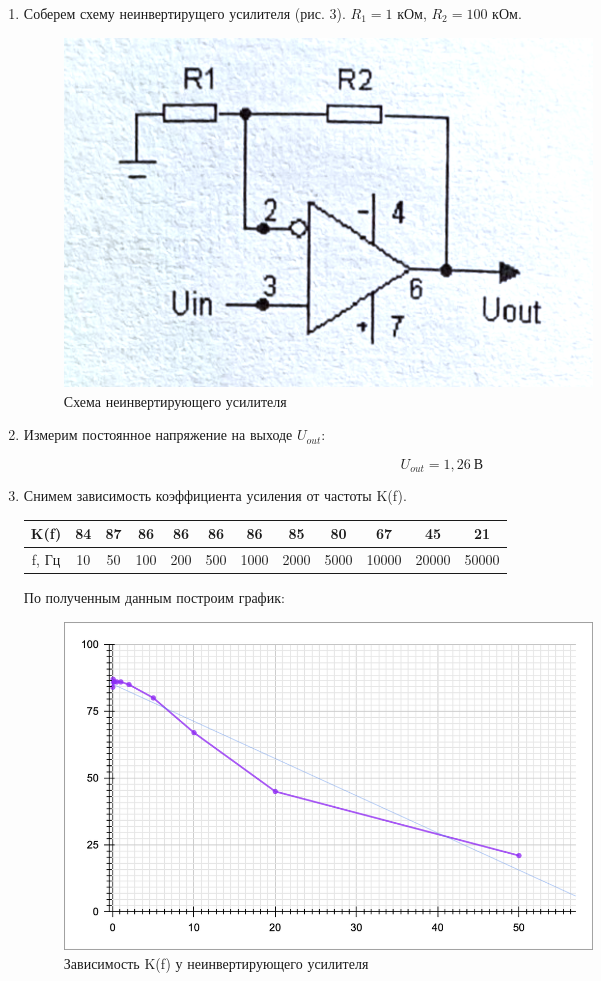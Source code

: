 \documentclass[a4paper, 12pt]{article}%
\begin{document}
\begin{enumerate}

\item Соберем схему неинвертирущего усилителя (рис. 3). $R_1	= 1$ кОм, $R_2 = 100$ кОм.

\begin{figure}[h]
\begin{center}
\includegraphics[width = 0.7\textwidth]{scheme2.png}
\caption{Схема неинвертирующего усилителя}
\end{center}
\end{figure}

\item Измерим постоянное напряжение на выходе $U_{out}$:

\[U_{out} = 1,26 \: \text{В}\]

\item Снимем зависимость коэффициента усиления от частоты K(f).

\begin{center}
\begin{tabular}{|c|c|c|c|c|c|c|c|c|c|c|c|}
\hline 
K(f) & 84 & 87 & 86 & 86 & 86 & 86 & 85 & 80 & 67 & 45 & 21 \\ 
\hline 
f, Гц & 10 & 50 & 100 & 200 & 500 & 1000 & 2000 & 5000 & 10000 & 20000 & 50000\\ 
\hline 
\end{tabular} 
\end{center}

По полученным данным построим график:

\begin{figure}[h]
\begin{center}
\includegraphics[width = 0.7\textwidth]{graph2.png}
\caption{Зависимость K(f) у неинвертирующего усилителя}
\end{center}
\end{figure}


\end{enumerate}
\end{document}
